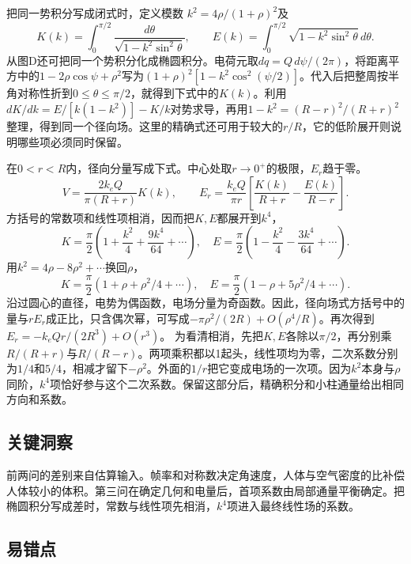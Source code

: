 \documentclass[UTF8,fontset=fandol,a4paper,11pt]{ctexart}
\begin{document}
把同一势积分写成闭式时，定义模数
$k^2=4\rho/(1+\rho)^2$及
\[
K(k)=\int_0^{\pi/2}\frac{d\theta}{\sqrt{1-k^2\sin^2\theta}},
\qquad
E(k)=\int_0^{\pi/2}\sqrt{1-k^2\sin^2\theta}\,d\theta.
\]
从图D还可把同一个势积分化成椭圆积分。电荷元取$dq=Q\,d\psi/(2\pi)$，将距离平方中的$1-2\rho\cos\psi+\rho^2$写为$(1+\rho)^2[1-k^2\cos^2(\psi/2)]$。代入后把整周按半角对称性折到$0\le\theta\le\pi/2$，就得到下式中的$K(k)$。利用$dK/dk=E/[k(1-k^2)]-K/k$对势求导，再用$1-k^2=(R-r)^2/(R+r)^2$整理，得到同一个径向场。这里的精确式还可用于较大的$r/R$，它的低阶展开则说明哪些项必须同时保留。

在$0<r<R$内，径向分量写成下式。中心处取$r\to0^+$的极限，$E_r$趋于零。
\[
V=\frac{2k_eQ}{\pi(R+r)}K(k),\qquad
E_r=\frac{k_eQ}{\pi r}
\left[\frac{K(k)}{R+r}-\frac{E(k)}{R-r}\right].
\]
方括号的常数项和线性项相消，因而把$K,E$都展开到$k^4$，
\[
K=\frac\pi2\left(1+\frac{k^2}{4}+\frac{9k^4}{64}+\cdots\right),
\quad
E=\frac\pi2\left(1-\frac{k^2}{4}-\frac{3k^4}{64}+\cdots\right).
\]
用$k^2=4\rho-8\rho^2+\cdots$换回$\rho$，
\[
K=\frac\pi2(1+\rho+\rho^2/4+\cdots),\quad
E=\frac\pi2(1-\rho+5\rho^2/4+\cdots).
\]
沿过圆心的直径，电势为偶函数，电场分量为奇函数。因此，径向场式方括号中的量与$r E_r$成正比，只含偶次幂，可写成$-\pi\rho^2/(2R)+O(\rho^4/R)$。再次得到
$E_r=-k_eQr/(2R^3)+O(r^3)$。
为看清相消，先把$K,E$各除以$\pi/2$，再分别乘$R/(R+r)$与$R/(R-r)$。两项乘积都以1起头，线性项均为零，二次系数分别为$1/4$和$5/4$，相减才留下$-\rho^2$。外面的$1/r$把它变成电场的一次项。因为$k^2$本身与$\rho$同阶，$k^4$项恰好参与这个二次系数。保留这部分后，精确积分和小柱通量给出相同方向和系数。





\subsection*{关键洞察}

前两问的差别来自估算输入。帧率和对称数决定角速度，人体与空气密度的比补偿人体较小的体积。第三问在确定几何和电量后，首项系数由局部通量平衡确定。把椭圆积分写成差时，常数与线性项先相消，$k^4$项进入最终线性场的系数。



\subsection*{易错点}
\end{document}
